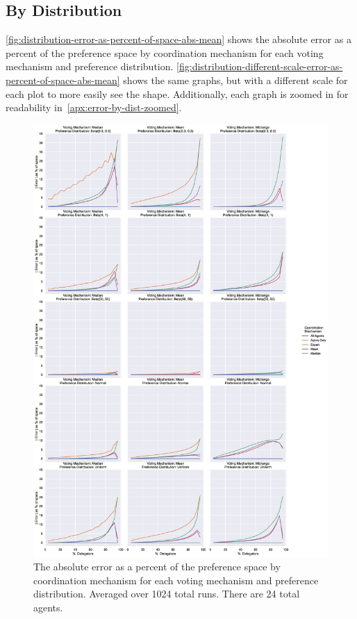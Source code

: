\subsection{By Distribution}\label{subsec:results-distribution}
\autoref{fig:distribution-error-as-percent-of-space-abs-mean} shows
the absolute error as a percent of the preference space by coordination mechanism for
each voting mechanism and preference distribution.
\autoref{fig:distribution-different-scale-error-as-percent-of-space-abs-mean} shows
the same graphs, but with a different scale for each plot to more easily see the shape.
Additionally, each graph is zoomed in for readability
in~\autoref{apx:error-by-dist-zoomed}.

\begin{figure}[p]
    \centering
    \includegraphics[scale=0.35]
    {content/chapter2/figures/distribution_error_as_percent_of_space_abs_mean}
    \caption{
        The absolute error as a percent of the preference space by coordination
        mechanism for each voting mechanism and preference distribution.
        Averaged over 1024 total runs.
        There are 24 total agents.
    }
    \label{fig:distribution-error-as-percent-of-space-abs-mean}
\end{figure}

